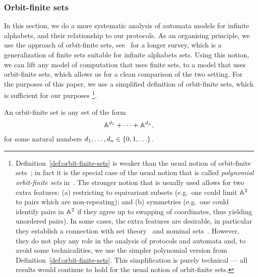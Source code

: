 \subsubsection{Orbit-finite sets}
\label{sec:orbit-finite-sets}
In this section, we do a more systematic analysis of automata models for infinite alphabets, and their relationship to our protocols. As an organising principle, we use the approach of orbit-finite sets, see~\cite{bojanczykOrbitFiniteSetsTheir2017} for a longer survey, which is a generalization of finite sets
suitable for infinite alphabets sets. Using this notion, we can lift any model of computation that uses finite sets, to a model that uses orbit-finite sets, which allows us for a clean comparison of the two setting. For the purposes of this paper, we use a simplified definition of orbit-finite sets, which is sufficient for our purposes
\footnote{
Definition~\ref{def:orbit-finite-sets} is weaker than the usual notion of orbit-finite sets~\cite[Section 5]{bojanczyk_slightly}; in fact it is the special case of the usual notion that is called \emph{polynomial orbit-finite sets} in~\cite[Section 1]{bojanczyk_slightly}.
The stronger  notion that is usually used  allows for two extra features: (a) restricting to equivariant subsets (e.g.~one could limit $\mathbb A^2$ to pairs which are non-repeating); and (b)  symmetries (e.g.~one could identify pairs in $\mathbb A^2$ if they agree up to swapping of coordinates, thus yielding unordered pairs). In some cases, the extra features are desirable, in particular they establish a connection with set theory~\cite{blassDedekind2016} and  nominal sets~\cite[Section 5]{PittsAM:nomsns}. However, they do not play any role in the analysis of protocols and automata and, to avoid some technicalities, we use the simpler polynomial version from Definition~\ref{def:orbit-finite-sets}. This simplification is purely technical --- all results would continue to hold for the usual notion of orbit-finite sets.
}.
\begin{definition} \label{def:orbit-finite-sets}
    An orbit-finite set is any set of the form 
    \begin{align*}
    \mathbb A^{d_1} + \cdots + \mathbb A^{d_n},
    \end{align*}
    for some natural numbers $d_1,\ldots,d_n \in \{0,1,\ldots\}$. 
\end{definition}

